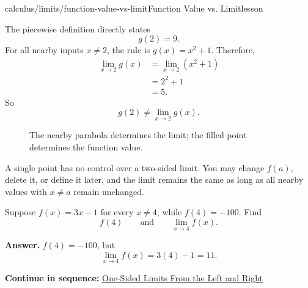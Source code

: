 \documentclass[11pt,openany]{book}
\theoremstyle{bgplain}
\newcounter{bgexample}[chapter]
\newcommand{\webnext}[2]{%
  \par\addvspace{1.2em}\noindent{\color{BGLine}\rule{\textwidth}{0.35pt}}\par\smallskip
  {\small\color{BGGray}\textbf{Continue in sequence:} \hyperlink{web:#1}{#2}}\par
}
\begin{document}
\begin{webpage}{calculus/limits/function-value-vs-limit}{Function Value vs. Limit}{lesson}
\begin{bgexample}[title={A piecewise value does not control the limit}]
\begin{bgsolution}
The piecewise definition directly states
\[
  \boxed{g(2)=9}.
\]
For all nearby inputs \(x\ne2\), the rule is \(g(x)=x^2+1\). Therefore,
\[
\begin{aligned}
\lim_{x\to2}g(x)
&=\lim_{x\to2}(x^2+1)\\
&=2^2+1\\
&=\boxed{5}.
\end{aligned}
\]
So
\[
  g(2)\ne\lim_{x\to2}g(x).
\]
\end{bgsolution}
\end{bgexample}

\begin{figure}[htbp]
\centering
{}
\caption{The nearby parabola determines the limit; the filled point determines the function value.}
\label{fig:value-v-limit}
\end{figure}

\begin{bgsummary}
A single point has no control over a two-sided limit. You may change \(f(a)\), delete it, or define it later, and the limit remains the same as long as all nearby values with \(x\ne a\) remain unchanged.
\end{bgsummary}

\begin{bgquickcheck}
Suppose \(f(x)=3x-1\) for every \(x\ne4\), while \(f(4)=-100\). Find
\[
  f(4)
  \qquad\text{and}\qquad
  \lim_{x\to4}f(x).
\]

\textbf{Answer.} \(f(4)=-100\), but
\[
  \lim_{x\to4}f(x)=3(4)-1=11.
\]
\end{bgquickcheck}
\webnext{calculus/limits/one-sided-limits}{One-Sided Limits From the Left and Right}
\end{webpage}
\end{document}
